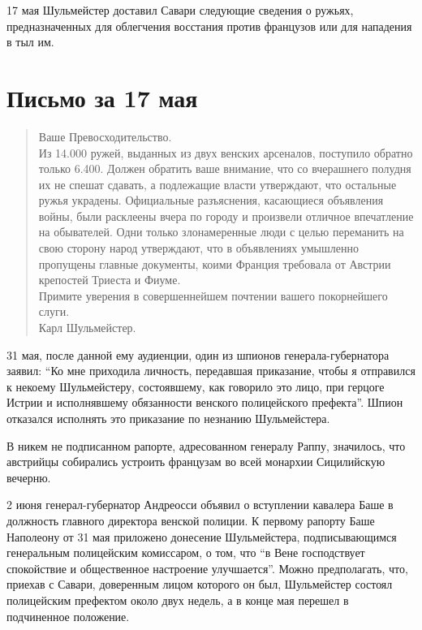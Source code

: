 \documentclass[
  oneside,
  12pt,
  titlepage]{book}
\begin{document}
17 мая Шульмейстер доставил Савари следующие сведения о ружьях, предназначенных для облегчения восстания против французов или для нападения в тыл им.

\hypertarget{ux43fux438ux441ux44cux43cux43e-ux437ux430-17-ux43cux430ux44f}{%
\section{Письмо за 17 мая}\label{ux43fux438ux441ux44cux43cux43e-ux437ux430-17-ux43cux430ux44f}}

\begin{quote}
Ваше Превосходительство.\\
Из 14.000 ружей, выданных из двух венских арсеналов, поступило обратно только 6.400. Должен обратить ваше внимание, что со вчерашнего полудня их не спешат сдавать, а подлежащие власти утверждают, что остальные ружья украдены. Официальные разъяснения, касающиеся объявления войны, были расклеены вчера по городу и произвели отличное впечатление на обывателей. Одни только злонамеренные люди с целью переманить на свою сторону народ утверждают, что в объявлениях умышленно пропущены главные документы, коими Франция требовала от Австрии крепостей Триеста и Фиуме.\\
Примите уверения в совершеннейшем почтении вашего покорнейшего слуги.\\
Карл Шульмейстер.
\end{quote}

31 мая, после данной ему аудиенции, один из шпионов генерала-губернатора заявил: ``Ко мне приходила личность, передавшая приказание, чтобы я отправился к некоему Шульмейстеру, состоявшему, как говорило это лицо, при герцоге Истрии и исполнявшему обязанности венского полицейского префекта''. Шпион отказался исполнять это приказание по незнанию Шульмейстера.

В никем не подписанном рапорте, адресованном генералу Раппу, значилось, что австрийцы собирались устроить французам во всей монархии Сицилийскую вечерню.

2 июня генерал-губернатор Андреосси объявил о вступлении кавалера Баше в должность главного директора венской полиции. К первому рапорту Баше Наполеону от 31 мая приложено донесение Шульмейстера, подписывающимся генеральным полицейским комиссаром, о том, что ``в Вене господствует спокойствие и общественное настроение улучшается''. Можно предполагать, что, приехав с Савари, доверенным лицом которого он был, Шульмейстер состоял полицейским префектом около двух недель, а в конце мая перешел в подчиненное положение.
\end{document}
